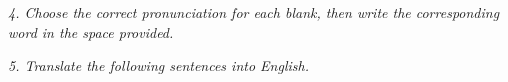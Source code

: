 \documentclass{exam}
\begin{document}
\noindent \textit{4. Choose the correct pronunciation for each blank, then write the corresponding word in the space provided.}

%
%
%
%
%
%
%
%
%
%
%
%
%
%
%
%
%
%
%
%




 \noindent \textit{5. Translate the following sentences into English.}

\begin{CJK*}{UTF8}{gbsn}
%
%
%
%
%
%
%
%
%
%
%
%
%
%
%
%
%
%
%
%
\end{CJK*}
\end{document}
